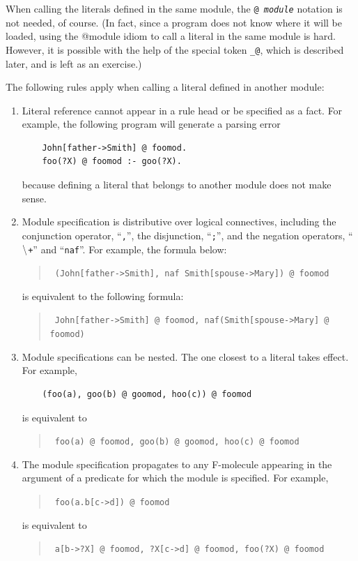 \documentclass[11pt]{article}
\makeatletter
\newcommand{\thismodule}{{\tt \_@}\xspace}
\newcommand{\PLGNAF}{\mbox{\tt \ensuremath{\tt\backslash}+}\xspace}
\newcommand{\RULELOGNAF}{{{\tt naf}}\xspace}
\makeatother
\begin{document}
When calling the literals defined in the same module, the {\tt @{\it
    module}} notation is not needed, of course. (In fact, since a program
does not know where it will be loaded, using the @module idiom to call a
literal in the same module is hard. However, it is possible with the help
of the special token \thismodule, which is described later, and is left
as an exercise.)

The following rules apply when calling a literal defined in another module:
\begin{enumerate}
\item Literal reference cannot appear in a rule head or be specified as
  a fact. For example, the following program will generate
  a parsing error
  \begin{verbatim}
    John[father->Smith] @ foomod.
    foo(?X) @ foomod :- goo(?X).
  \end{verbatim}
  because defining a literal that belongs to another module does not make
  sense.
  
\item Module specification is distributive over logical connectives,
  including the conjunction operator, ``\verb|,|'', the disjunction,
  ``\verb|;|'', and the negation operators, ``\PLGNAF'' and
  ``\RULELOGNAF''. For example, the formula below:
  \begin{quote}
    {\tt
    (John[father->Smith], \RULELOGNAF Smith[spouse->Mary]) @ foomod
    }
  \end{quote}
  is equivalent to the following formula:
  \begin{quote}
    {\tt
    John[father->Smith] @ foomod, \RULELOGNAF (Smith[spouse->Mary] @ foomod)
    }
  \end{quote}

\item Module specifications can be nested. The one closest to a literal
  takes effect. For example,
  \begin{verbatim}
    (foo(a), goo(b) @ goomod, hoo(c)) @ foomod
  \end{verbatim}
  is equivalent to
  \begin{quote}
    {\tt
      foo(a) @ foomod, goo(b) @ goomod, hoo(c) @ foomod
    }
  \end{quote}
  
\item The module specification propagates to any F-molecule appearing
  in the argument of a predicate for which the module is
  specified. For example,
  \begin{quote}
    {\tt
    foo(a.b[c->d]) @ foomod
    }
  \end{quote}
  is equivalent to
  \begin{quote}
    {\tt
    a[b->?X] @ foomod, ?X[c->d] @ foomod, foo(?X) @ foomod
    }
  \end{quote}
  

\end{enumerate}
\end{document}
